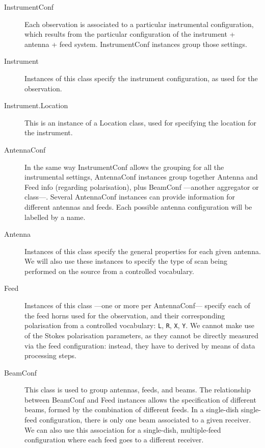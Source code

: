 		\begin{description}
			\item[InstrumentConf] Each observation is associated to
			a particular instrumental configuration, which results
			from the particular configuration of the instrument +
			antenna + feed system. InstrumentConf instances group
			those settings.
			
			 \item[Instrument] Instances of this class specify the
			instrument configuration, as used for the observation.
			
			 \item[Instrument.Location] This is an instance of a
			Location class, used for specifying the location for
			the instrument.
			
			 \item[AntennaConf] In the same way InstrumentConf
			allows the grouping for all the instrumental settings,
			AntennaConf instances group together Antenna and Feed
			info (regarding polarisation), plus BeamConf ---another
			aggregator or class---. Several AntennaConf instances
			can provide information for different antennas and
			feeds. Each possible antenna configuration will be
			labelled by a name.
			
			 \item[Antenna] Instances of this class specify the
			general properties for each given antenna. We will also
			use these instances to specify the type of scan being
			performed on the source from a controlled vocabulary.
			
			 \item[Feed] Instances of this class ---one or more per
			AntennaConf--- specify each of the feed horns used for
			the observation, and their corresponding polarisation
			from a controlled vocabulary: \texttt{L}, \texttt{R},
			\texttt{X}, \texttt{Y}. We cannot make use of the
			Stokes polarisation parameters, as they cannot be
			directly measured via the feed configuration: instead,
			they have to derived by means of data processing steps.
			
			 \item[BeamConf] This class is used to group antennas,
			feeds, and beams. The relationship between BeamConf and
			Feed instances allows the specification of different
			beams, formed by the combination of different feeds. In
			a single-dish single-feed configuration, there is only
			one beam associated to a given receiver. We can also
			use this association for a single-dish, multiple-feed
			configuration where each feed goes to a different
			receiver.
			

\end{description}
